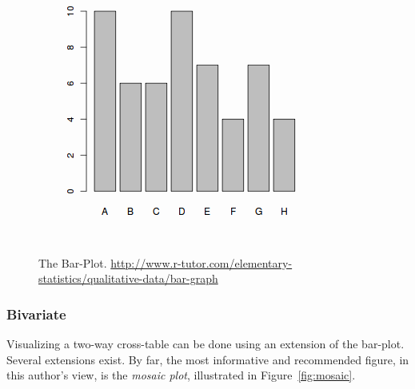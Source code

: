 \begin{figure}[h]
\centering
\includegraphics[height=0.3\textheight]{art/categorical-data1x}
\caption[Bar Plot]{The Bar-Plot. \newline
\url{http://www.r-tutor.com/elementary-statistics/qualitative-data/bar-graph}}
\label{fig:barplot}
\end{figure}



\subsubsection{Bivariate}
Visualizing a two-way cross-table can be done using an extension of the bar-plot.
Several extensions exist. By far, the most informative and recommended figure, in this author's view, is the \emph{mosaic plot}, illustrated in Figure~\ref{fig:mosaic}. 

